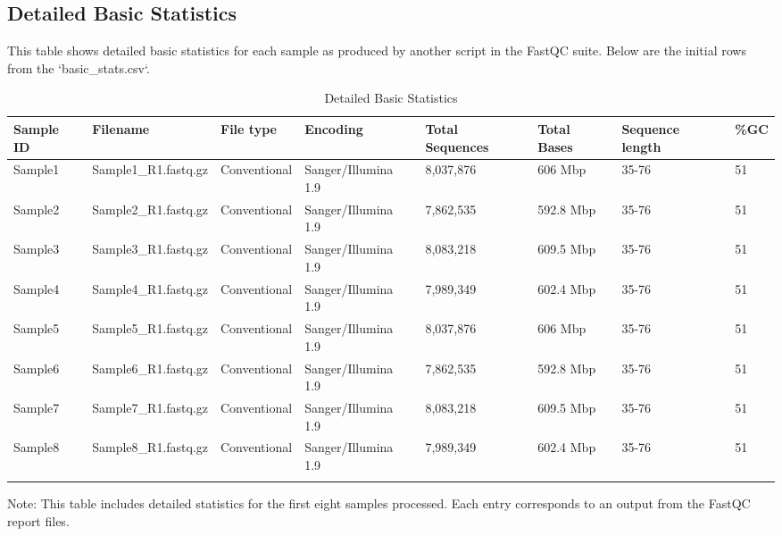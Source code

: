\documentclass[unnumsec,webpdf,contemporary,large]{oup-authoring-template}%
\theoremstyle{thmstyleone}%
\theoremstyle{thmstyletwo}%
\theoremstyle{thmstylethree}%
\begin{document}
\subsection{Detailed Basic Statistics}

This table shows detailed basic statistics for each sample as produced by another script in the FastQC suite. Below are the initial rows from the `basic_stats.csv`.

\begin{table}[htbp]
\caption{Detailed Basic Statistics\label{tab2}}
\centering
\begin{tabular}{@{}llllllll@{}}
\toprule
Sample ID & Filename & File type & Encoding & Total Sequences & Total Bases & Sequence length & \%GC \\
\midrule
Sample1 & Sample1_R1.fastq.gz & Conventional & Sanger/Illumina 1.9 & 8,037,876 & 606 Mbp & 35-76 & 51 \\
Sample2 & Sample2_R1.fastq.gz & Conventional & Sanger/Illumina 1.9 & 7,862,535 & 592.8 Mbp & 35-76 & 51 \\
Sample3 & Sample3_R1.fastq.gz & Conventional & Sanger/Illumina 1.9 & 8,083,218 & 609.5 Mbp & 35-76 & 51 \\
Sample4 & Sample4_R1.fastq.gz & Conventional & Sanger/Illumina 1.9 & 7,989,349 & 602.4 Mbp & 35-76 & 51 \\
Sample5 & Sample5_R1.fastq.gz & Conventional & Sanger/Illumina 1.9 & 8,037,876 & 606 Mbp & 35-76 & 51 \\
Sample6 & Sample6_R1.fastq.gz & Conventional & Sanger/Illumina 1.9 & 7,862,535 & 592.8 Mbp & 35-76 & 51 \\
Sample7 & Sample7_R1.fastq.gz & Conventional & Sanger/Illumina 1.9 & 8,083,218 & 609.5 Mbp & 35-76 & 51 \\
Sample8 & Sample8_R1.fastq.gz & Conventional & Sanger/Illumina 1.9 & 7,989,349 & 602.4 Mbp & 35-76 & 51 \\
\botrule
\end{tabular}
\begin{tablenotes}%
\item Note: This table includes detailed statistics for the first eight samples processed. Each entry corresponds to an output from the FastQC report files.
\end{tablenotes}
\end{table}

\end{document}
